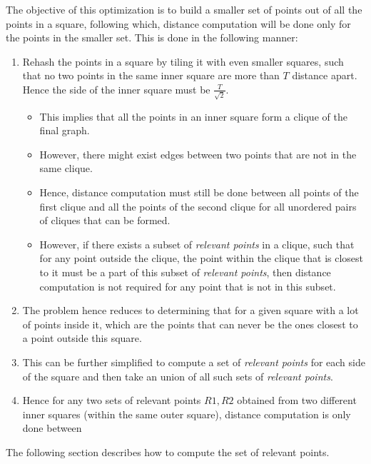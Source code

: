 The objective of this optimization is to build a smaller set of points out of all the points in a square, following which, distance computation will be done only for the points in the smaller set. This is done in the following manner:
\begin{enumerate}
        \item Rehash the points in a square by tiling it with even smaller squares, such that no two points in the same inner square are more than \begin{math} T \end{math} distance apart. Hence the side of the inner square must be \begin{math} \frac{T}{\sqrt2} \end{math}.
            \begin{itemize}
            \item This implies that all the points in an inner square form a clique of the final graph.
            \item However, there might exist edges between two points that are not in the same clique.
            \item Hence, distance computation must still be done between all points of the first clique and all the points of the second clique for all unordered pairs of cliques that can be formed.
            \item However, if there exists a subset of \emph{relevant points} in a clique, such that for any point outside the clique, the point within the clique that is closest to it must be a part of this subset of \emph{relevant points}, then distance computation is not required for any point that is not in this subset.
            \end{itemize}
        \item The problem hence reduces to determining that for a given square with a lot of points inside it, which are the points that can never be the ones closest to a point outside this square.
        \item This can be further simplified to compute a set of \emph{relevant points} for each side of the square and then take an union of all such sets of \emph{relevant points}.
        \item Hence for any two sets of relevant points \begin{math} R1, R2 \end{math} obtained from two different inner squares (within the same outer square), distance computation is only done between %
\end{enumerate}
The following section describes how to compute the set of relevant points.

